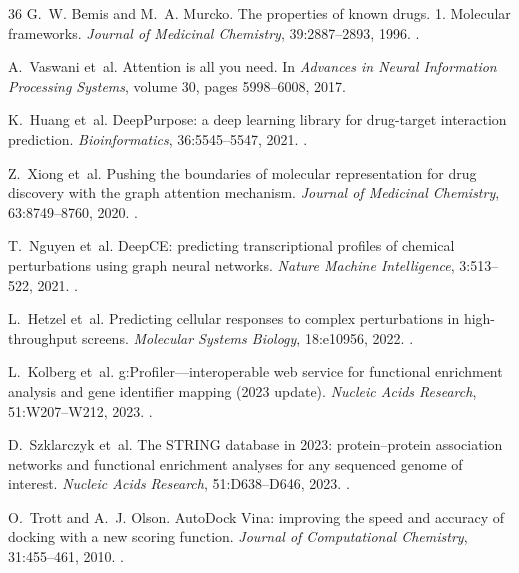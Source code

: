\begin{thebibliography}{36}
G.~W. Bemis and M.~A. Murcko.
\newblock The properties of known drugs. 1. Molecular frameworks.
\newblock \emph{Journal of Medicinal Chemistry}, 39:2887--2893, 1996.
\newblock {}.

A.~Vaswani et~al.
\newblock Attention is all you need.
\newblock In \emph{Advances in Neural Information Processing Systems}, volume 30, pages 5998--6008, 2017.

K.~Huang et~al.
\newblock DeepPurpose: a deep learning library for drug-target interaction prediction.
\newblock \emph{Bioinformatics}, 36:5545--5547, 2021.
\newblock {}.

Z.~Xiong et~al.
\newblock Pushing the boundaries of molecular representation for drug discovery with the graph attention mechanism.
\newblock \emph{Journal of Medicinal Chemistry}, 63:8749--8760, 2020.
\newblock {}.

T.~Nguyen et~al.
\newblock DeepCE: predicting transcriptional profiles of chemical perturbations using graph neural networks.
\newblock \emph{Nature Machine Intelligence}, 3:513--522, 2021.
\newblock {}.

L.~Hetzel et~al.
\newblock Predicting cellular responses to complex perturbations in high-throughput screens.
\newblock \emph{Molecular Systems Biology}, 18:e10956, 2022.
\newblock {}.

L.~Kolberg et~al.
\newblock g:Profiler---interoperable web service for functional enrichment analysis and gene identifier mapping (2023 update).
\newblock \emph{Nucleic Acids Research}, 51:W207--W212, 2023.
\newblock {}.

D.~Szklarczyk et~al.
\newblock The STRING database in 2023: protein--protein association networks and functional enrichment analyses for any sequenced genome of interest.
\newblock \emph{Nucleic Acids Research}, 51:D638--D646, 2023.
\newblock {}.

O.~Trott and A.~J. Olson.
\newblock AutoDock Vina: improving the speed and accuracy of docking with a new scoring function.
\newblock \emph{Journal of Computational Chemistry}, 31:455--461, 2010.
\newblock {}.


\end{thebibliography}
